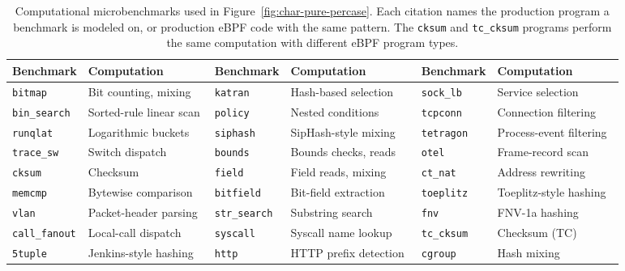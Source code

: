 \begin{table}[t]
\centering
\small
\caption{Computational microbenchmarks used in Figure~\ref{fig:char-pure-percase}. Each citation names the production program a benchmark is modeled on, or production eBPF code with the same pattern. The \texttt{cksum} and \texttt{tc\_cksum} programs perform the same computation with different eBPF program types.}
\label{tab:microbenchmarks}
\renewcommand{\arraystretch}{1.08}
\begin{tabular*}{\textwidth}{@{\extracolsep{\fill}}ll@{\hspace{1em}}ll@{\hspace{1em}}ll@{}}
\toprule
\textbf{Benchmark} & \textbf{Computation} & \textbf{Benchmark} & \textbf{Computation} & \textbf{Benchmark} & \textbf{Computation} \\
\midrule
\texttt{bitmap} & Bit counting, mixing & \texttt{katran} & Hash-based selection~\cite{katran} & \texttt{sock\_lb} & Service selection~\cite{cilium} \\
\texttt{bin\_search} & Sorted-rule linear scan & \texttt{policy} & Nested conditions~\cite{cilium} & \texttt{tcpconn} & Connection filtering~\cite{bcc} \\
\texttt{runqlat} & Logarithmic buckets~\cite{bcc} & \texttt{siphash} & SipHash-style mixing & \texttt{tetragon} & Process-event filtering~\cite{tetragon} \\
\texttt{trace\_sw} & Switch dispatch~\cite{tetragon} & \texttt{bounds} & Bounds checks, reads & \texttt{otel} & Frame-record scan~\cite{otelprofiler} \\
\texttt{cksum} & Checksum~\cite{katran,rfc1071} & \texttt{field} & Field reads, mixing & \texttt{ct\_nat} & Address rewriting~\cite{cilium} \\
\texttt{memcmp} & Bytewise comparison~\cite{pixie_prefix_compare} & \texttt{bitfield} & Bit-field extraction & \texttt{toeplitz} & Toeplitz-style hashing~\cite{qemu_ebpf_rss,microsoft_rss_toeplitz} \\
\texttt{vlan} & Packet-header parsing~\cite{suricata_ebpf} & \texttt{str\_search} & Substring search~\cite{bpftrace} & \texttt{fnv} & FNV-1a hashing~\cite{bpftrace} \\
\texttt{call\_fanout} & Local-call dispatch~\cite{tetragon} & \texttt{syscall} & Syscall name lookup~\cite{tracee} & \texttt{tc\_cksum} & Checksum (TC)~\cite{katran,rfc1071} \\
\texttt{5tuple} & Jenkins-style hashing~\cite{cilium,jenkins2006lookup3} & \texttt{http} & HTTP prefix detection~\cite{tracee} & \texttt{cgroup} & Hash mixing \\
\bottomrule
\end{tabular*}
\end{table}
